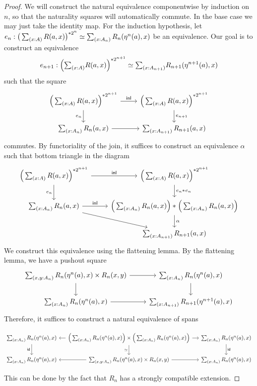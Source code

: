 \documentclass[reqno]{amsart}
\begin{document}
\begin{proof}
We will construct the natural equivalence componentwise by induction on $n$, so that the naturality squares will automatically commute. In the base case we may just take the identity map. For the induction hypothesis, let $e_n:\eqv{\big(\sm{x:A}R(a,x)\big)^{\ast 2^n}}{\sm{x:A_n} R_n(\eta^n(a),x)}$ be an equivalence. Our goal is to construct an equivalence
\begin{equation*}
e_{n+1}:\eqv{\Big(\sm{x:A}R(a,x)\Big)^{\ast 2^{n+1}}}{\sm{x:A_{n+1}} R_{n+1}(\eta^{n+1}(a),x)}
\end{equation*}
such that the square
\begin{equation*}
\begin{tikzcd}
\Big(\sm{x:A}R(a,x)\Big)^{\ast 2^{n+1}} \arrow[d,swap,"e_n"] \arrow[r,"\inl"] & \Big(\sm{x:A}R(a,x)\Big)^{\ast 2^{n+1}} \arrow[d,"e_{n+1}"] \\
\sm{x:A_n}R_n(a,x) \arrow[r] & \sm{x:A_{n+1}}R_{n+1}(a,x)
\end{tikzcd}
\end{equation*}
commutes. By functoriality of the join, it suffices to construct an equivalence $\alpha$ such that bottom triangle in the diagram
\begin{equation*}
\begin{tikzcd}
\Big(\sm{x:A}R(a,x)\Big)^{\ast 2^{n+1}} \arrow[d,swap,"e_n"] \arrow[r,"\inl"] & \Big(\sm{x:A}R(a,x)\Big)^{\ast 2^{n+1}} \arrow[d,"\join{e_n}{e_n}"] \\
\sm{x:A_n}R_n(a,x) \arrow[r,"\inl"] \arrow[dr] & \join{\Big(\sm{x:A_n}R_n(a,x)\Big)}{\Big(\sm{x:A_n}R_n(a,x)\Big)} \arrow[d,"\alpha"] \\
& \sm{x:A_{n+1}}R_{n+1}(a,x)
\end{tikzcd}
\end{equation*}
We construct this equivalence using the flattening lemma. By the flattening lemma, we have a pushout square
\begin{equation*}
\begin{tikzcd}
\sm{x,y:A_n}R_n(\eta^n(a),x)\times R_n(x,y) \arrow[r] \arrow[d] & \sm{x:A_n}R_n(\eta^n(a),x) \arrow[d] \\
\sm{x:A_n}R_n(\eta^n(a),x) \arrow[r] & \sm{x:A_{n+1}}R_{n+1}(\eta^{n+1}(a),x)
\end{tikzcd}
\end{equation*}
Therefore, it suffices to construct a natural equivalence of spans
\begin{tiny}
\begin{equation*}
\begin{tikzcd}[column sep=small]
\sm{x:A_n}R_n(\eta^n(a),x) \arrow[d,swap,"\idfunc"] & \Big(\sm{x:A_n}R_n(\eta^n(a),x)\Big)\times\Big(\sm{x:A_n}R_n(\eta^n(a),x)\Big) \arrow[l] \arrow[r] \arrow[d,swap,"\eqvsym"] & \sm{x:A_n}R_n(\eta^n(a),x) \arrow[d,"\idfunc"] \\
\sm{x:A_n}R_n(\eta^n(a),x) & \sm{x,y:A_n} R_n(\eta^n(a),x)\times R_n(x,y) \arrow[l] \arrow[r] & \sm{x:A_n}R_n(\eta^n(a),x)
\end{tikzcd}
\end{equation*}
\end{tiny}
This can be done by the fact that $R_n$ has a strongly compatible extension.


\end{proof}
\end{document}
